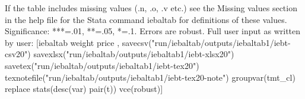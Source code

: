 If the table includes missing values (.n, .o, .v etc.) see the Missing values section in the help file for the Stata command iebaltab for definitions of these values. Significance: ***=.01, **=.05, *=.1. Errors are robust. Full user input as written by user: [iebaltab weight price , savecsv("run/iebaltab/outputs/iebaltab1/iebt-csv20") savexlsx("run/iebaltab/outputs/iebaltab1/iebt-xlsx20") savetex("run/iebaltab/outputs/iebaltab1/iebt-tex20") texnotefile("run/iebaltab/outputs/iebaltab1/iebt-tex20-note") groupvar(tmt\_cl) replace stats(desc(var) pair(t)) vce(robust)] 
